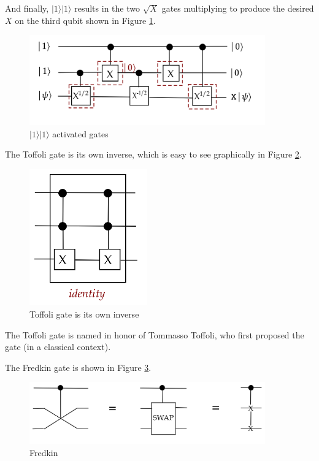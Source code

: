 \documentclass[main.tex]{subfiles}
\begin{document}
    And finally, $|1\rangle|1\rangle$ results in the two $\sqrt{X}$ gates multiplying to produce the desired $X$ on the third qubit shown in Figure \ref{fig:38ccnot8}.
    
    \begin{figure}
        \centering
        \includegraphics[width=4in]{notes/figs/n08/38ccnot8.png}
        \caption{$|1\rangle|1\rangle$ activated gates}
        \label{fig:38ccnot8}
    \end{figure}
    
    The Toffoli gate is its own inverse, which is easy to see graphically in Figure \ref{fig:39toffoli4}.
    
    \begin{figure}
        \centering
        \includegraphics[width=2in]{notes/figs/n08/39toffoli4.png}
        \caption{Toffoli gate is its own inverse}
        \label{fig:39toffoli4}
    \end{figure}
    
    The Toffoli gate is named in honor of Tommasso Toffoli, who first proposed the gate (in a classical context). 
    
    The Fredkin gate is shown in Figure \ref{fig:40fredkin}.
    
    \begin{figure}
        \centering
        \includegraphics[width=4in]{notes/figs/n08/40fredkin.png}
        \caption{Fredkin}
        \label{fig:40fredkin}
    \end{figure}
    
\end{document}
